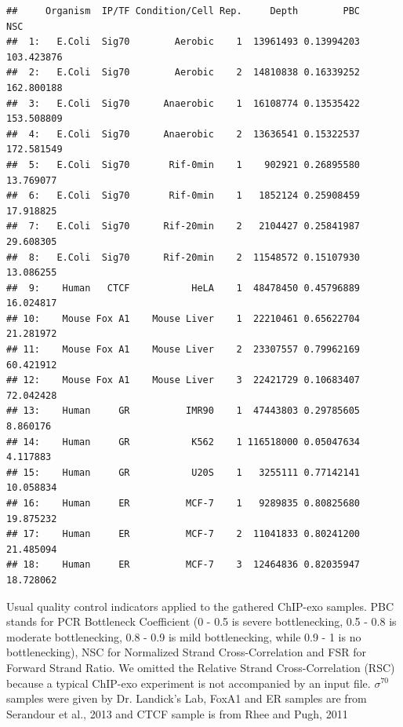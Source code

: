 \documentclass{bmcart}\usepackage[]{graphicx}\usepackage[]{color}
\makeatletter
\newenvironment{kframe}{%
 \def\at@end@of@kframe{}%
 \ifinner\ifhmode%
  \def\at@end@of@kframe{\end{minipage}}%
  \begin{minipage}{\columnwidth}%
 \fi\fi%
 \def\FrameCommand##1{\hskip\@totalleftmargin \hskip-\fboxsep
 \colorbox{shadecolor}{##1}\hskip-\fboxsep
     \hskip-\linewidth \hskip-\@totalleftmargin \hskip\columnwidth}%
 \MakeFramed {\advance\hsize-\width
   \@totalleftmargin\z@ \linewidth\hsize
   \@setminipage}}%
 {\par\unskip\endMakeFramed%
 \at@end@of@kframe}
\newenvironment{knitrout}{}{} %
\newcommand{\sig}{\sigma^{70}}
\makeatother
\begin{document}

\begin{table}[h!]
  \centering

\begin{knitrout}
\color{fgcolor}\begin{kframe}
\begin{verbatim}
##     Organism  IP/TF Condition/Cell Rep.     Depth        PBC        NSC
##  1:   E.Coli  Sig70        Aerobic    1  13961493 0.13994203 103.423876
##  2:   E.Coli  Sig70        Aerobic    2  14810838 0.16339252 162.800188
##  3:   E.Coli  Sig70      Anaerobic    1  16108774 0.13535422 153.508809
##  4:   E.Coli  Sig70      Anaerobic    2  13636541 0.15322537 172.581549
##  5:   E.Coli  Sig70       Rif-0min    1    902921 0.26895580  13.769077
##  6:   E.Coli  Sig70       Rif-0min    1   1852124 0.25908459  17.918825
##  7:   E.Coli  Sig70      Rif-20min    2   2104427 0.25841987  29.608305
##  8:   E.Coli  Sig70      Rif-20min    2  11548572 0.15107930  13.086255
##  9:    Human   CTCF           HeLA    1  48478450 0.45796889  16.024817
## 10:    Mouse Fox A1    Mouse Liver    1  22210461 0.65622704  21.281972
## 11:    Mouse Fox A1    Mouse Liver    2  23307557 0.79962169  60.421912
## 12:    Mouse Fox A1    Mouse Liver    3  22421729 0.10683407  72.042428
## 13:    Human     GR          IMR90    1  47443803 0.29785605   8.860176
## 14:    Human     GR           K562    1 116518000 0.05047634   4.117883
## 15:    Human     GR           U20S    1   3255111 0.77142141  10.058834
## 16:    Human     ER          MCF-7    1   9289835 0.80825680  19.875232
## 17:    Human     ER          MCF-7    2  11041833 0.80241200  21.485094
## 18:    Human     ER          MCF-7    3  12464836 0.82035947  18.728062
\end{verbatim}
\end{kframe}
\end{knitrout}
\caption{Usual quality control indicators applied to the gathered
  ChIP-exo samples.  PBC stands for PCR Bottleneck Coefficient (0 -
  0.5 is severe bottlenecking, 0.5 - 0.8 is moderate bottlenecking,
  0.8 - 0.9 is mild bottlenecking, while 0.9 - 1 is no bottlenecking),
  NSC for Normalized Strand Cross-Correlation and FSR for Forward
  Strand Ratio. We omitted the Relative Strand Cross-Correlation (RSC)
  because a typical ChIP-exo experiment is not accompanied by an input
  file. $\sig$ samples were given by Dr. Landick's Lab, FoxA1 and ER
  samples are from Serandour et al., 2013 \cite{exoillumina} and CTCF
  sample is from Rhee and Pugh, 2011 \cite{exo1}}
  \label{tab:qc} %
\end{table}
\end{document}
